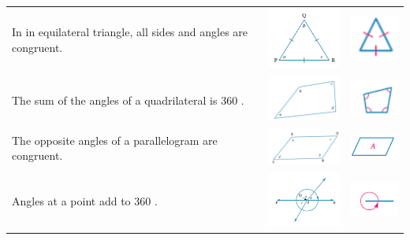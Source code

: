 \documentclass[a4paper,10pt]{report}
\begin{document}
\begin{center}
\begin{tabular}{|p{5cm}|p{3cm}|p{2cm}|}
		In in equilateral triangle, all sides and angles are congruent.                           & \includegraphics[width=3cm]{geometry theorem 8}  & \includegraphics[width=2cm]{geometry theorem 8 symbol}  \\
		The sum of the angles of a quadrilateral is 360 \degree.                                  & \includegraphics[width=3cm]{geometry theorem 9}  & \includegraphics[width=2cm]{geometry theorem 9 symbol}  \\
		The opposite angles of a parallelogram are congruent.                                     & \includegraphics[width=3cm]{geometry theorem 10} & \includegraphics[width=2cm]{geometry theorem 10 symbol} \\
		Angles at a point add to 360 \degree.                                                     & \includegraphics[width=3cm]{geometry theorem 11} & \includegraphics[width=2cm]{geometry theorem 11 symbol} \\
	\end{tabular}
\end{center}
\end{document}
